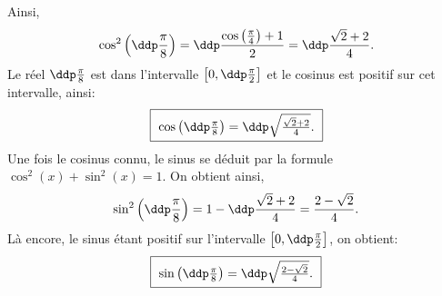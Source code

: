 \begin{correction}
\begin{itemize}
Ainsi, 
$$\cos^2{\left(\ddp\frac{\pi}{8}\right)}=\ddp\frac{\cos{\left(\frac{\pi}{4}\right)}+1}{2}=\ddp\frac{\sqrt{2}+2}{4}.$$
Le r\'eel $\ddp\frac{\pi}{8}$ est dans l'intervalle $\left\lbrack 0,\ddp\frac{\pi}{2}\right\rbrack$ et le cosinus est positif sur cet intervalle, ainsi: 
\begin{equation*}
\fbox{
$\cos{\left(\ddp\frac{\pi}{8}\right)}=\ddp\sqrt{\frac{\sqrt{2}+2}{4}}.$
}
\end{equation*}
Une fois le cosinus connu, le sinus se d\'eduit par la formule $\cos^2{(x)}+\sin^2{(x)}=1$. On obtient ainsi, 
$$\sin^2{\left(\ddp\frac{\pi}{8}\right)}=1-\ddp \frac{\sqrt{2}+2}{4} = \frac{2-\sqrt{2}}{4}.$$
L\`a encore, le sinus \'etant positif sur l'intervalle $\left\lbrack 0,\ddp\frac{\pi}{2}\right\rbrack$, on obtient: 
\begin{equation*}
\fbox{
$\sin{\left(\ddp\frac{\pi}{8}\right)}=\ddp\sqrt{\frac{2-\sqrt{2}}{4}}.$
}
\end{equation*}
\end{itemize}
\end{correction}

\newpage


